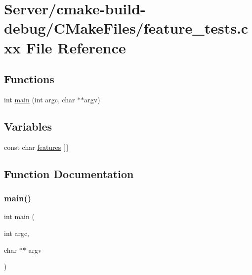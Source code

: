 \hypertarget{Server_2cmake-build-debug_2CMakeFiles_2feature__tests_8cxx}{}\section{Server/cmake-\/build-\/debug/\+C\+Make\+Files/feature\+\_\+tests.cxx File Reference}
\label{Server_2cmake-build-debug_2CMakeFiles_2feature__tests_8cxx}
\subsection*{Functions}
\begin{DoxyCompactItemize}
\item 
int \mbox{\hyperlink{Server_2cmake-build-debug_2CMakeFiles_2feature__tests_8cxx_a3c04138a5bfe5d72780bb7e82a18e627}{main}} (int argc, char $\ast$$\ast$argv)
\end{DoxyCompactItemize}
\subsection*{Variables}
\begin{DoxyCompactItemize}
\item 
const char \mbox{\hyperlink{Server_2cmake-build-debug_2CMakeFiles_2feature__tests_8cxx_a1582568e32f689337602a16bf8a5bff0}{features}} \mbox{[}$\,$\mbox{]}
\end{DoxyCompactItemize}


\subsection{Function Documentation}
\mbox{\label{Server_2cmake-build-debug_2CMakeFiles_2feature__tests_8cxx_a3c04138a5bfe5d72780bb7e82a18e627}} 
\subsubsection{\texorpdfstring{main()}{main()}}
{\footnotesize\ttfamily int main (\begin{DoxyParamCaption}\item[{int}]{argc,  }\item[{char $\ast$$\ast$}]{argv }\end{DoxyParamCaption})}



